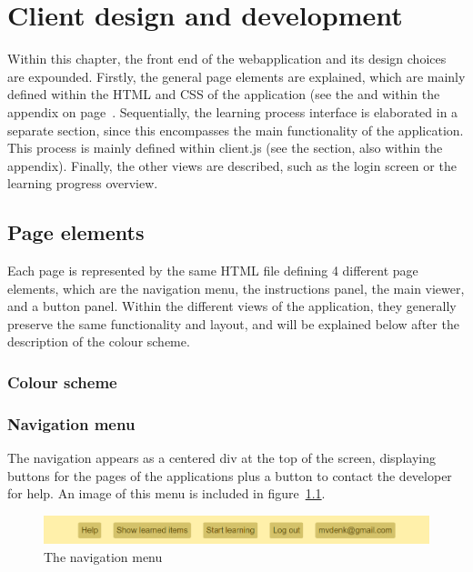 \chapter{Client design and development}
\label{ch:client}

Within this chapter, the front end of the webapplication and its design choices are expounded. Firstly, the general page elements are explained, which are mainly defined within the HTML and CSS of the application (see the  and  within the  appendix on page~\pageref{app:clientsource}. Sequentially, the learning process interface is elaborated in a separate section, since this encompasses the main functionality of the application. This process is mainly defined within client.js (see the  section, also within the  appendix). Finally, the other views are described, such as the login screen or the learning progress overview.

\section{Page elements}

Each page is represented by the same HTML file defining 4 different page elements, which are the navigation menu, the instructions panel, the main viewer, and a button panel. Within the different views of the application, they generally preserve the same functionality and layout, and will be explained below after the description of the colour scheme.

\subsection{Colour scheme}

\subsection{Navigation menu}

The navigation appears as a centered div at the top of the screen, displaying buttons for the pages of the applications plus a button to contact the developer for help. An image of this menu is included in figure~\ref{fig:navmenu}.

\begin{figure}
    \centering
    \includegraphics[width=.8\textwidth]{img/navmenu.png}
    \caption{The navigation menu}
    \label{fig:navmenu}
\end{figure}

